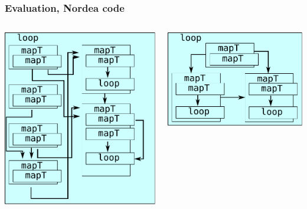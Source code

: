 \documentclass[rgb,dvipsnames]{beamer}
\begin{document}
\begin{frame}
  \frametitle{Evaluation, Nordea code}

\begin{columns}
\begin{column}{0.4\textwidth}
  \includegraphics[width=\textwidth]{img/HiperfitEgCos-unfused.pdf}
\end{column}
\begin{column}{0.4\textwidth}
  \includegraphics[width=\textwidth]{img/HiperfitEgCos-fused.pdf}
\end{column}
\end{columns}


\end{frame}
\end{document}
